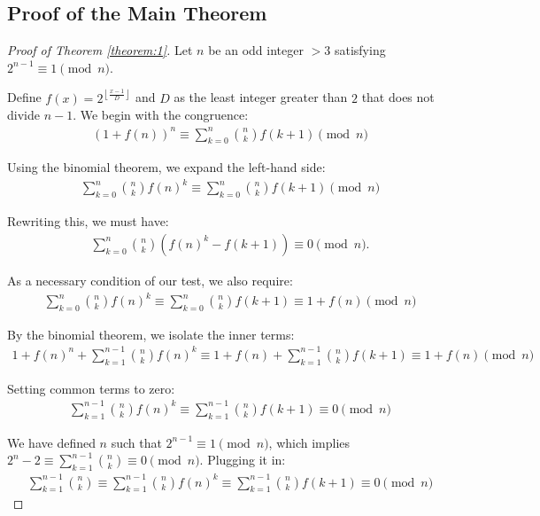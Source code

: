 \documentclass{article}
\theoremstyle{plain}
\theoremstyle{definition}
\begin{document}
\subsection{Proof of the Main Theorem}
\begin{proof}[Proof of Theorem \ref{theorem:1}]
Let \( n \) be an odd integer $>3$ satisfying $2^{n-1} \equiv 1 \pmod{n}$.

Define \( f(x) = 2^{\left\lfloor \frac{x-1}{D} \right\rfloor} \) and \( D \) as the least integer greater than \( 2 \) that does not divide \( n-1 \). We begin with the congruence:
\begin{align}
(1 + f(n))^n \equiv \sum_{k=0}^{n} \binom{n}{k} f(k+1) \pmod{n}
\end{align}

Using the binomial theorem, we expand the left-hand side:
\begin{align}
\sum_{k=0}^{n} \binom{n}{k} f(n)^k \equiv \sum_{k=0}^{n} \binom{n}{k} f(k+1) \pmod{n}
\end{align}

Rewriting this, we must have:
\begin{align}
\sum_{k=0}^{n} \binom{n}{k} \left(f(n)^k - f(k+1)\right) \equiv 0 \pmod{n}.
\end{align}

As a necessary condition of our test, we also require:
\begin{align}
      \sum_{k=0}^{n} \binom{n}{k} f(n)^k \equiv \sum_{k=0}^{n} \binom{n}{k} f(k+1) \equiv 1 + f(n) \pmod{n}
\end{align}

By the binomial theorem, we isolate the inner terms:
\begin{align}
      1 + f(n)^n + \sum_{k=1}^{n-1} \binom{n}{k} f(n)^k \equiv 1 + f(n) + \sum_{k=1}^{n-1} \binom{n}{k} f(k+1) \equiv 1 + f(n) \pmod{n}
\end{align}

Setting common terms to zero:
\begin{align} \label{equation:congruence1}
      \sum_{k=1}^{n-1} \binom{n}{k} f(n)^k \equiv \sum_{k=1}^{n-1} \binom{n}{k} f(k+1) \equiv 0 \pmod{n}
\end{align}

We have defined $n$ such that $2^{n-1} \equiv 1 \pmod{n}$, which implies $2^n - 2 \equiv \sum_{k=1}^{n-1} \binom{n}{k} \equiv 0 \pmod{n}$. Plugging it in:
\begin{align}
      \sum_{k=1}^{n-1} \binom{n}{k} \equiv \sum_{k=1}^{n-1} \binom{n}{k} f(n)^k \equiv \sum_{k=1}^{n-1} \binom{n}{k} f(k+1) \equiv 0 \pmod{n}
\end{align}


\end{proof}
\end{document}

